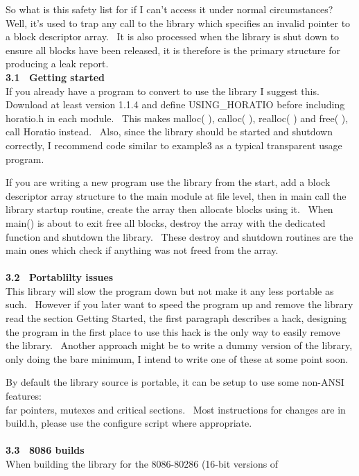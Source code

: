 \documentclass{article}
\begin{document}
\par So what is this safety list for if I can't access it under normal
circumstances?~
Well, it's used to trap any call to the library which specifies an
invalid
pointer to a block descriptor array.~ It is also processed when
the
library is shut down to ensure all blocks have been released, it is
therefore
is the primary structure for producing a leak report.
\\
\textbf{3.1~ Getting started}
\\
If you already have a program to convert to use the library I suggest
this.~ Download at least version 1.1.4 and define USING\_HORATIO
before
including horatio.h in each module.~ This makes malloc( ),
calloc( ), realloc( ) and free( ), call Horatio instead.~ Also,
since the library should
be started and shutdown correctly, I recommend code similar to example3
as a typical transparent usage program.
\par If you are writing a new program use the library from the start, add
a block descriptor array structure to the main module at file level,
then
in main call the library startup routine, create the array then
allocate
blocks using it.~ When main() is about to exit free all blocks,
destroy
the array with the dedicated function and shutdown the library.~
These
destroy and shutdown routines are the main ones which check if anything
was not freed from the array.\\
\\
\textbf{3.2~ Portablilty issues}
\\
This library will slow the program down but not make it any less
portable
as such.~ However if you later want to speed the program up and
remove
the library read the section Getting Started, the first paragraph
describes
a hack, designing the program in the first place to use this hack is
the
only way to easily remove the library.~ Another approach might be
to write a dummy version of the library, only doing the bare minimum, I
intend to write one of these at some point soon.
\par By default the library source is portable, it can be setup to use
some
non-ANSI features:
\\
far pointers, mutexes and critical sections.~
Most instructions for changes are in build.h, please use the configure
script
where appropriate.\\
\\
\textbf{3.3~ 8086 builds}
\\
When building the library for the 8086-80286 (16-bit versions of
\end{document}
